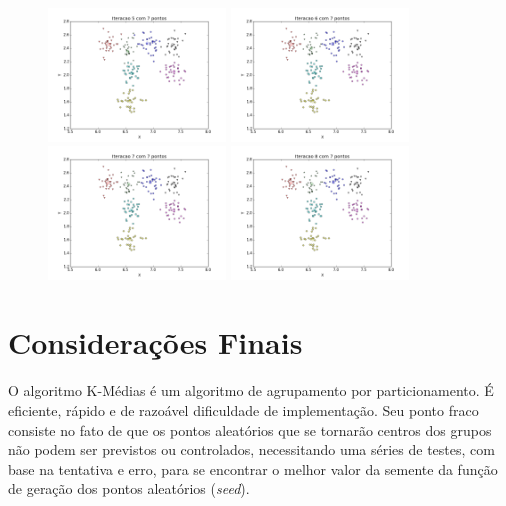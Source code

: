 \documentclass[12pt, a4paper]{article}
\begin{document}
\begin{landscape}
\begin{figure}[!ht]
    \includegraphics[width=0.42\textwidth]{depois_5.png} 
    \includegraphics[width=0.42\textwidth]{depois_6.png}
    \includegraphics[width=0.42\textwidth]{depois_7.png} 
    \includegraphics[width=0.42\textwidth]{depois_8.png}
\end{figure}
\end{landscape}

\section{Considerações Finais}
O algoritmo K-Médias é um algoritmo de agrupamento por particionamento. É eficiente, rápido e de razoável dificuldade de implementação. Seu ponto fraco consiste no fato de que os pontos aleatórios que se tornarão centros dos grupos não podem ser previstos ou controlados, necessitando uma séries de testes, com base na tentativa e erro, para se encontrar o melhor valor da semente da função de geração dos pontos aleatórios (\emph{seed}).
\end{document}
